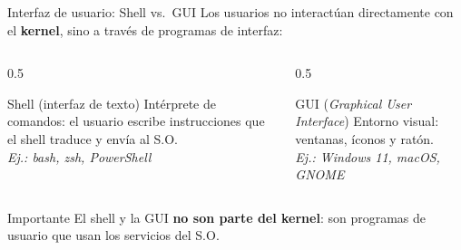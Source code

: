 \documentclass[xcolor=svgnames]{beamer}
\begin{document}
\begin{frame}{Interfaz de usuario: Shell vs.\ GUI}
  Los usuarios no interactúan directamente con el \textbf{kernel}, sino a través de programas de interfaz:

  \vspace{0.3cm}

  \begin{columns}[T]
    \begin{column}{0.5\textwidth}
      \begin{block}{Shell (interfaz de texto)}
        Intérprete de comandos: el usuario escribe instrucciones que el shell traduce y envía al S.O.\\
        \textit{Ej.: bash, zsh, PowerShell}
      \end{block}
    \end{column}
    \begin{column}{0.5\textwidth}
      \begin{block}{GUI (\textit{Graphical User Interface})}
        Entorno visual: ventanas, íconos y ratón.\\
        \textit{Ej.: Windows 11, macOS, GNOME}
      \end{block}
    \end{column}
  \end{columns}

  \vspace{0.4cm}
  \begin{alertblock}{Importante}
    El shell y la GUI \textbf{no son parte del kernel}: son programas de usuario que usan los servicios del S.O.
  \end{alertblock}
\end{frame}
\end{document}
